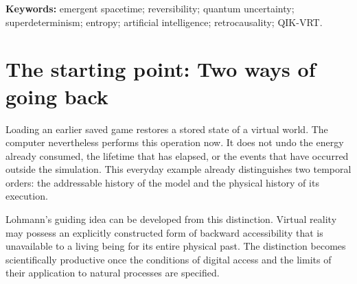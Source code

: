 \renewcommand{\langtag}{en}
\begin{abstract}
A virtual world can preserve its initial state, rules, and inputs in a way that allows earlier states to be restored exactly. The physical world offers no comparable complete access to an observer acting within it. This asymmetry provides a basis for a precise discussion of computation, entropy, quantum mechanics, and time. This article distinguishes deterministic evolution, logical reversibility, epistemic reconstruction, and physical backward influence. It defines virtual entropy relative to an observer and explains why artificial intelligence can change that observer's uncertainty without generating ontic randomness from determinism. Approaches to emergent spacetime raise the further question of whether geometry arises from more fundamental relations. Light cones and uncertainty relations have different roles: the former constrain relativistic reachability, while the latter constrain the simultaneous sharpness of particular quantum observables. The discussion concludes with a testable research programme and a philosophical interpretation of life, finitude, and responsibility. Lohmann's rejection of a completely predetermined physical universe is included as a guiding thesis; an experimental exclusion of all superdeterministic models is not inferred from it.
\end{abstract}
\noindent\textbf{Keywords:} emergent spacetime; reversibility; quantum uncertainty; superdeterminism; entropy; artificial intelligence; retrocausality; QIK-VRT.

\section{The starting point: Two ways of going back}\label{en:sec1}
Loading an earlier saved game restores a stored state of a virtual world. The computer nevertheless performs this operation now. It does not undo the energy already consumed, the lifetime that has elapsed, or the events that have occurred outside the simulation. This everyday example already distinguishes two temporal orders: the addressable history of the model and the physical history of its execution.

Lohmann's guiding idea can be developed from this distinction. Virtual reality may possess an explicitly constructed form of backward accessibility that is unavailable to a living being for its entire physical past. The distinction becomes scientifically productive once the conditions of digital access and the limits of their application to natural processes are specified.

